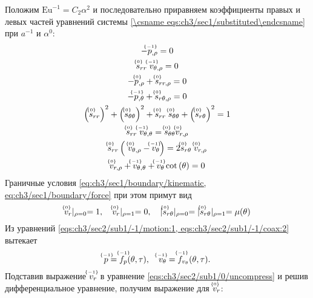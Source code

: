 Положим $\text{Eu}^{-1} = C_2 \alpha^2$ и последовательно приравняем коэффициенты правых и левых частей уравнений системы \cref{\csname eqs:ch3/sec1/substituted\endcsname} при $a^{-1}$ и $\alpha^0$:
\begin{gather}
  \label{eqs:ch3/sec2/sub1/-1/motion:1}
  -\uindex{p}{-1}_{,\rho} = 0
  \\
  \label{eqs:ch3/sec2/sub1/-1/coax:2}
  \uindex{s}{0}_{rr} \; \uindex{v}{-1}_{\theta,\rho} = 0
  \\
  \label{eqs:ch3/sec2/sub1/0/motion:1}
  -\uindex{p}{0}_{,\rho} + \uindex{s}{0}_{rr,\rho} = 0
  \\
  \label{eqs:ch3/sec2/sub1/0/motion:2}
  -\uindex{p}{-1}_{,\theta} + \uindex{s}{0}_{r\theta,\rho} = 0
  \\
  \label{eqs:ch3/sec2/sub1/0/plasticity}
  \left(\uindex{s}{0}_{rr}\right)^2 + \left(\uindex{s}{0}_{\theta\theta}\right)^2 + \uindex{s}{0}_{rr}\; \uindex{s}{0}_{\theta\theta} + \left(\uindex{s}{0}_{r\theta}\right)^2 = 1
  \\
  \label{eqs:ch3/sec2/sub1/0/coax:1}
  \uindex{s}{0}_{rr} \; \uindex{v}{-1}_{\theta,\theta} = \uindex{s}{0}_{\theta\theta} \uindex{v}{0}_{r,\rho}
  \\
  \label{eqs:ch3/sec2/sub1/0/coax:2}
  \uindex{s}{0}_{rr} \left(\ \uindex{v}{0}_{\theta,\rho} - \uindex{v}{-1}_{\theta}\right) = 2 \uindex{s}{0}_{r\theta} \; \uindex{v}{0}_{r,\rho}
  \\
  \label{eqs:ch3/sec2/sub1/0/uncompress}
  \uindex{v}{0}_{r,\rho} + \uindex{v}{-1}_{\theta,\theta} + \uindex{v}{-1}_{\theta} \cot{\left(\theta\right)} = 0
\end{gather}
Граничные условия \cref{eq:ch3/sec1/boundary/kinematic, eq:ch3/sec1/boundary/force} при этом примут вид
\begin{equation}
  \label{eq:ch3/sec2/sub1/boundary/0}
  \uindex{v}{0}_{r}\lvert_{\rho=0} = 1, \quad \uindex{v}{0}_{r}\lvert_{\rho=1} = 0, \quad \lvert \uindex{s}{0}_{r\theta}\lvert_{\rho=0} = \lvert \uindex{s}{0}_{r\theta}\lvert_{\rho=1} = \mu(\theta)
\end{equation}
Из уравнений \cref{eqs:ch3/sec2/sub1/-1/motion:1, eqs:ch3/sec2/sub1/-1/coax:2} вытекает
\begin{equation*}
  \uindex{p}{-1} = \uindex{f}{-1}_{p}(\theta, \tau), \quad \uindex{v}{-1}_{\theta} = \uindex{f}{-1}_{v_{\theta}}(\theta, \tau).
\end{equation*}
Подставив выражение $\uindex{v}{-1}_{r}$ в уравнение \cref{eqs:ch3/sec2/sub1/0/uncompress} и решив дифференциальное уравнение, получим выражение для $\uindex{v}{0}_{r}$:
